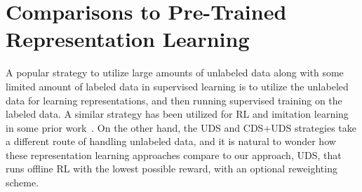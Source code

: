 \begin{table}[t!]
\centering
{}
\caption{\footnotesize On the multi-task Meta-World domain, we compare CDS+UDS and UDS to the model-based offline RL method COMBO~\citep{yu2021combo} that trains a dynamics model on all of the data and performs model-based offline training using the learned model. CDS+UDS and UDS are able to outperform COMBO by a large margin.}
\label{tbl:combo}
\normalsize
\end{table}

\section{Comparisons to Pre-Trained Representation Learning}
\label{app:pretrained_reps}
A popular strategy to utilize large amounts of unlabeled data along with some limited amount of labeled data in supervised learning is to utilize the unlabeled data for learning representations, and then running supervised training on the labeled data. A similar strategy has been utilized for RL and imitation learning in some prior work~\citep{yang2021representation,yang2021trail}. On the other hand, the UDS and CDS+UDS strategies take a different route of handling unlabeled data, and it is natural to wonder how these representation learning approaches compare to our approach, UDS, that runs offline RL with the lowest possible reward, with an optional reweighting scheme.

